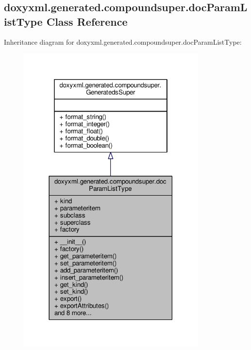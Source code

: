 \subsection{doxyxml.\+generated.\+compoundsuper.\+doc\+Param\+List\+Type Class Reference}
\label{classdoxyxml_1_1generated_1_1compoundsuper_1_1docParamListType}


Inheritance diagram for doxyxml.\+generated.\+compoundsuper.\+doc\+Param\+List\+Type\+:
\nopagebreak
\begin{figure}[H]
\begin{center}
\leavevmode
\includegraphics[width=270pt]{d4/d6b/classdoxyxml_1_1generated_1_1compoundsuper_1_1docParamListType__inherit__graph}
\end{center}
\end{figure}


